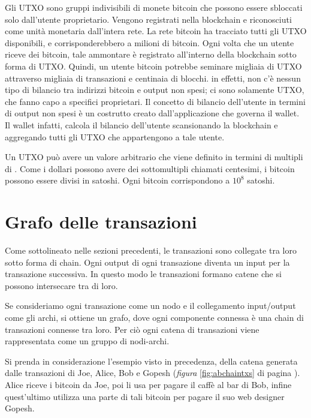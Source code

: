Gli UTXO sono gruppi indivisibili di monete bitcoin che possono essere sbloccati solo dall'utente proprietario. Vengono registrati nella blockchain e riconosciuti come unità monetaria dall'intera rete.
La rete bitcoin ha tracciato tutti gli UTXO disponibili, e corrisponderebbero a milioni di bitcoin. Ogni volta che un utente riceve dei bitcoin, tale ammontare è registrato all'interno della blockchain sotto forma di UTXO. Quindi, un utente bitcoin potrebbe seminare migliaia di UTXO attraverso migliaia di transazioni e centinaia di blocchi. in effetti, non c'è nessun tipo di bilancio tra indirizzi bitcoin e output non spesi; ci sono solamente UTXO, che fanno capo a specifici proprietari. Il concetto di bilancio dell'utente in termini di output non spesi è un costrutto creato dall'applicazione che governa il wallet. Il wallet infatti, calcola il bilancio dell'utente scansionando la blockchain e aggregando tutti gli UTXO che appartengono a tale utente.

Un UTXO può avere un valore arbitrario che viene definito in termini di multipli di . Come i dollari possono avere dei sottomultipli chiamati centesimi, i bitcoin possono essere divisi in satoshi. Ogni bitcoin corrispondono a $10^8$ satoshi.\cite{antonopoulos2014mastering}

\section{Grafo delle transazioni}

Come sottolineato nelle sezioni precedenti, le transazioni sono collegate tra loro sotto forma di chain. Ogni output di ogni transazione diventa un input per la transazione successiva. In questo modo le transazioni formano catene che si possono intersecare tra di loro.

Se consideriamo ogni transazione come un nodo e il collegamento input/output come gli archi, si ottiene un grafo, dove ogni componente connessa è una chain di transazioni connesse tra loro. Per ciò ogni catena di transazioni viene rappresentata come un gruppo di nodi-archi.

Si prenda in considerazione l'esempio visto in precedenza, della catena generata dalle transazioni di Joe, Alice, Bob e Gopesh (\textit{figura} \ref{fig:abchaintxs} di pagina \pageref{fig:abchaintxs}). Alice riceve i bitcoin da Joe, poi li usa per pagare il caffè al bar di Bob, infine quest'ultimo utilizza una parte di tali bitcoin per pagare il suo web designer Gopesh.

